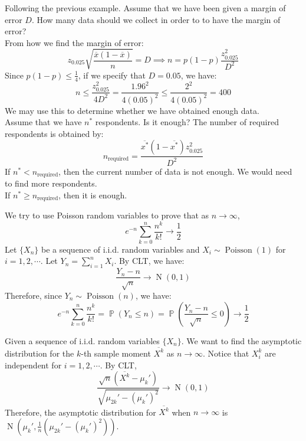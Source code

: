 \documentclass{huhtakm-template-book-v2}
\DeclareMathOperator{\prob}{\mathbb{P}}
\DeclareMathOperator{\Poisson}{Poisson}
\DeclareMathOperator{\N}{N}
\begin{document}
\newpage
\begin{eg}
	Following the previous example. Assume that we have been given a margin of error $D$. How many data should we collect in order to to have the margin of error?\\
	From how we find the margin of error:
	\begin{equation*}
		z_{0.025}\sqrt{\frac{\overline{x}(1-\overline{x})}{n}}=D\implies n=p(1-p)\frac{z_{0.025}^{2}}{D^{2}}
	\end{equation*}
	Since $p(1-p)\leq\frac{1}{4}$, if we specify that $D=0.05$, we have:
	\begin{equation*}
		n\leq\frac{z_{0.025}^{2}}{4D^{2}}=\frac{1.96^{2}}{4(0.05)^{2}}\leq\frac{2^{2}}{4(0.05)^{2}}=400
	\end{equation*}
	We may use this to determine whether we have obtained enough data.\\
	Assume that we have $n^{*}$ respondents. Is it enough? The number of required respondents is obtained by:
	\begin{equation*}
		n_{\text{required}}=\frac{\overline{x^{*}}(1-\overline{x^{*}})z_{0.025}^{2}}{D^{2}}
	\end{equation*}
	If $n^{*}<n_{\text{required}}$, then the current number of data is not enough. We would need to find more respondents.\\
	If $n^{*}\geq n_{\text{required}}$, then it is enough.
\end{eg}
\begin{eg}
	We try to use Poisson random variables to prove that as $n\to\infty$,
	\begin{equation*}
		e^{-n}\sum_{k=0}^{n}\frac{n^{k}}{k!}\to\frac{1}{2}
	\end{equation*}
	Let $\{X_{n}\}$ be a sequence of i.i.d. random variables and $X_{i}\sim\Poisson(1)$ for $i=1,2,\cdots$. Let $Y_{n}=\sum_{i=1}^{n}X_{i}$. By CLT, we have:
	\begin{equation*}
		\frac{Y_{n}-n}{\sqrt{n}}\to\N(0,1)
	\end{equation*}
	Therefore, since $Y_{n}\sim\Poisson(n)$, we have:
	\begin{equation*}
		e^{-n}\sum_{k=0}^{n}\frac{n^{k}}{k!}=\prob(Y_{n}\leq n)=\prob(\frac{Y_{n}-n}{\sqrt{n}}\leq 0)\to\frac{1}{2}
	\end{equation*}
\end{eg}
\begin{eg}
	Given a sequence of i.i.d. random variables $\{X_{n}\}$. We want to find the asymptotic distribution for the $k$-th sample moment $\overline{X^{k}}$ as $n\to\infty$. Notice that $X_{i}^{k}$ are independent for $i=1,2,\cdots$. By CLT,
	\begin{equation*}
		\frac{\sqrt{n}(\overline{X^{k}}-\mu_{k}')}{\sqrt{\mu_{2k}'-(\mu_{k}')^{2}}}\to\N(0,1)
	\end{equation*}
	Therefore, the asymptotic distribution for $\overline{X^{k}}$ when $n\to\infty$ is $\N(\mu_{k}',\frac{1}{n}(\mu_{2k}'-(\mu_{k}')^{2}))$.
\end{eg}
\end{document}
